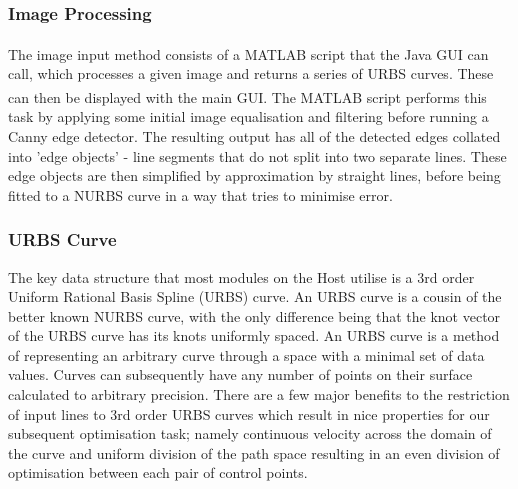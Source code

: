 \subsubsection{Image Processing}
The image input method consists of a MATLAB\textsuperscript{\textregistered} script that the Java GUI can call, which processes a given image and returns a series of URBS curves. These can then be displayed with the main GUI. The MATLAB\textsuperscript{\textregistered} script performs this task by applying some initial image equalisation and filtering before running a Canny edge detector. The resulting output has all of the detected edges collated into 'edge objects' - line segments that do not split into two separate lines. These edge objects are then simplified by approximation by straight lines, before being fitted to a NURBS curve in a way that tries to minimise error.

\subsubsection{URBS Curve}
The key data structure that most modules on the Host utilise is a 3rd order Uniform Rational Basis Spline (URBS) curve. An URBS curve is a cousin of the better known NURBS curve, with the only difference being that the knot vector of the URBS curve has its knots uniformly spaced. An URBS curve is a method of representing an arbitrary curve through a space with a minimal set of data values. Curves can subsequently have any number of points on their surface calculated to arbitrary precision. There are a few major benefits to the restriction of input lines to 3rd order URBS curves which result in nice properties for our subsequent optimisation task; namely continuous velocity across the domain of the curve and uniform division of the path space resulting in an even division of optimisation between each pair of control points.

